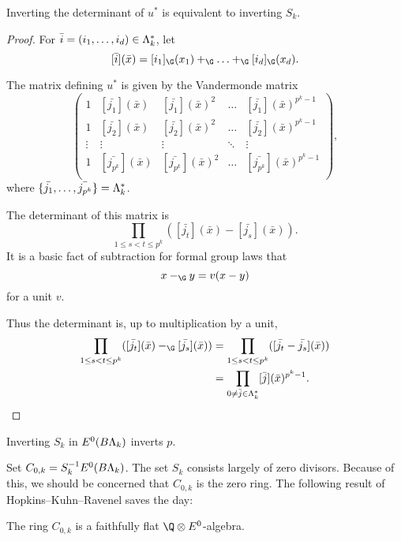 \begin{lemma} \label{det}
Inverting the determinant of $u^*$ is equivalent to inverting $S_k$.
\end{lemma}
\begin{proof}
For $\bar{i} = (i_1, \ldots, i_d) \in \Lambda_k^*$, let
\[
[\bar{i}](\bar{x}) = [i_1]_{\G}(x_1) +_{\G} \ldots +_{\G} [i_d]_{\G}(x_d).
\]

The matrix defining $u^*$ is given by the Vandermonde matrix
\[
\left(
\begin{array}{ccccc}
1 & [\bar{j_1}](\bar{x}) & [\bar{j_1}](\bar{x})^2 & \ldots & [\bar{j_{1}}](\bar{x})^{p^k-1} \\
1 & [\bar{j_2}](\bar{x}) & [\bar{j_2}](\bar{x})^2 & \ldots & [\bar{j_{2}}](\bar{x})^{p^k-1}\\
\vdots & \vdots & \vdots & \ddots & \vdots \\
1 & [\bar{j_{p^k}}](\bar{x}) & [\bar{j_{p^k}}](\bar{x})^2 & \ldots & [\bar{j_{p^k}}](\bar{x})^{p^k-1}\\
\end{array} \right),
\]
where $\{\bar{j_1},\ldots,\bar{j_{p^k}}\} = \Lambda_k^*$.

The determinant of this matrix is
\[
\prod_{1 \leq s < t \leq p^k} ([\bar{j_t}](\bar{x}) - [\bar{j_s}](\bar{x})).
\]
It is a basic fact of subtraction for formal group laws that
\[
x -_{\G} y = v(x-y)
\]
for a unit $v$. 

Thus the determinant is, up to multiplication by a unit, 
\begin{align*}
\prod_{1 \leq s < t \leq p^k} ([\bar{j_t}](\bar{x}) -_{\G} [\bar{j_s}](\bar{x})) & = \prod_{1 \leq s < t \leq p^k} ([\bar{j_t} - \bar{j_s}](\bar{x})) \\
& = \prod_{0 \neq \bar{j} \in \Lk^*} [\bar{j}](\bar{x})^{p^k-1}. \qedhere
\end{align*} 
\end{proof}

\begin{corollary}
Inverting $S_k$ in $E^0(B\Lambda_k)$ inverts $p$.
\end{corollary}

Set $C_{0,k} = S_{k}^{-1}E^0(B\Lambda_k)$.  The set $S_k$ consists largely of zero divisors. Because of this, we should be concerned that $C_{0,k}$ is the zero ring. The following result of Hopkins--Kuhn--Ravenel saves the day:

\begin{proposition}
The ring $C_{0,k}$ is a faithfully flat $\Q \otimes E^0$-algebra.
\end{proposition}

